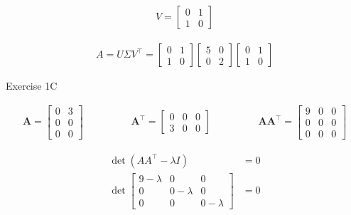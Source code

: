 \documentclass[11pt,letterpaper]{article}
\begin{document}
\begin{enumerate}
\begin{align*}
V = {\begin{bmatrix}
        0 & 1 \\
        1 & 0
    \end{bmatrix}}
\end{align*}

\begin{align*}
A = U \Sigma V^\top
= \begin{bmatrix}
        0 & 1 \\
        1 & 0
    \end{bmatrix}
    \begin{bmatrix}
        5 & 0 \\
        0 & 2
    \end{bmatrix}
    \begin{bmatrix}
        0 & 1 \\
        1 & 0
    \end{bmatrix}
\end{align*}

\noindent\dotfill Exercise 1C \noindent\dotfill

\begin{align*}
    \mathbf{A} 
    = \begin{bmatrix}
        0 & 3 \\
        0 & 0 \\
        0 & 0
    \end{bmatrix}
    \hspace{2cm}
    \mathbf{A^\top} 
    = \begin{bmatrix}
        0 & 0 & 0 \\
        3 & 0 & 0
    \end{bmatrix}
    \hspace{2cm}
    \mathbf{A A^\top} 
    = \begin{bmatrix}
        9 & 0 & 0 \\
        0 & 0 & 0 \\
        0 & 0 & 0
    \end{bmatrix}
\end{align*}

\begin{align*}
\det{(AA^\top - \lambda I)} &= 0 \\
\det{\begin{bmatrix}
        9-\lambda & 0 & 0 \\
        0 & 0-\lambda & 0 \\
        0 & 0 & 0-\lambda
    \end{bmatrix}} &= 0
\end{align*}


\end{enumerate}
\end{document}
